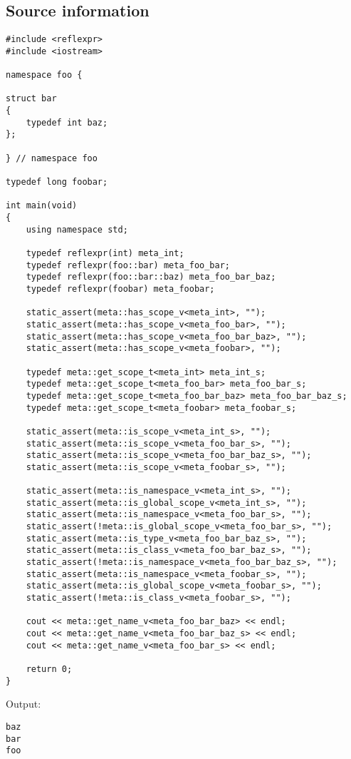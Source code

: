 \subsection{Source information}

\begin{verbatim}
#include <reflexpr>
#include <iostream>

namespace foo {

struct bar
{
	typedef int baz;
};

} // namespace foo

typedef long foobar;

int main(void)
{
	using namespace std;

	typedef reflexpr(int) meta_int;
	typedef reflexpr(foo::bar) meta_foo_bar;
	typedef reflexpr(foo::bar::baz) meta_foo_bar_baz;
	typedef reflexpr(foobar) meta_foobar;

	static_assert(meta::has_scope_v<meta_int>, "");
	static_assert(meta::has_scope_v<meta_foo_bar>, "");
	static_assert(meta::has_scope_v<meta_foo_bar_baz>, "");
	static_assert(meta::has_scope_v<meta_foobar>, "");

	typedef meta::get_scope_t<meta_int> meta_int_s;
	typedef meta::get_scope_t<meta_foo_bar> meta_foo_bar_s;
	typedef meta::get_scope_t<meta_foo_bar_baz> meta_foo_bar_baz_s;
	typedef meta::get_scope_t<meta_foobar> meta_foobar_s;

	static_assert(meta::is_scope_v<meta_int_s>, "");
	static_assert(meta::is_scope_v<meta_foo_bar_s>, "");
	static_assert(meta::is_scope_v<meta_foo_bar_baz_s>, "");
	static_assert(meta::is_scope_v<meta_foobar_s>, "");

	static_assert(meta::is_namespace_v<meta_int_s>, "");
	static_assert(meta::is_global_scope_v<meta_int_s>, "");
	static_assert(meta::is_namespace_v<meta_foo_bar_s>, "");
	static_assert(!meta::is_global_scope_v<meta_foo_bar_s>, "");
	static_assert(meta::is_type_v<meta_foo_bar_baz_s>, "");
	static_assert(meta::is_class_v<meta_foo_bar_baz_s>, "");
	static_assert(!meta::is_namespace_v<meta_foo_bar_baz_s>, "");
	static_assert(meta::is_namespace_v<meta_foobar_s>, "");
	static_assert(meta::is_global_scope_v<meta_foobar_s>, "");
	static_assert(!meta::is_class_v<meta_foobar_s>, "");

	cout << meta::get_name_v<meta_foo_bar_baz> << endl;
	cout << meta::get_name_v<meta_foo_bar_baz_s> << endl;
	cout << meta::get_name_v<meta_foo_bar_s> << endl;

	return 0;
}
\end{verbatim}

Output:

\begin{verbatim}
baz
bar
foo
\end{verbatim}

